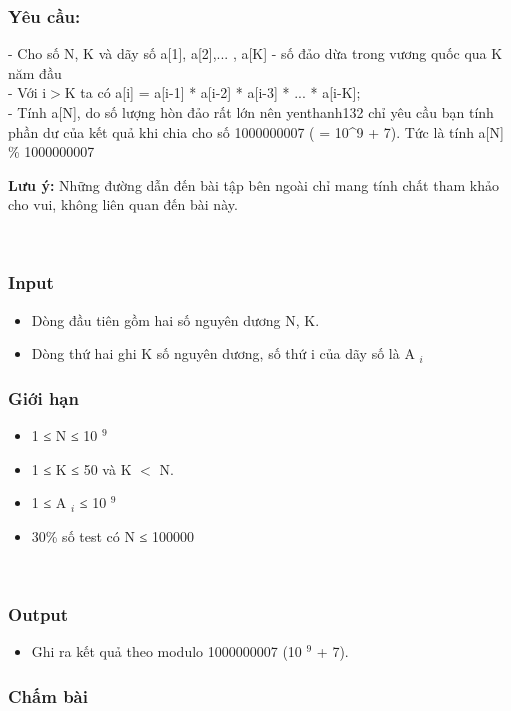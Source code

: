 \subsubsection{\textbf{Yêu cầu: }}

- Cho số N, K và dãy số a[1], a[2],... , a[K] - số đảo dừa trong vương quốc qua K năm đầu
\\- Với i$>$K ta có a[i] = a[i-1] * a[i-2] * a[i-3] * ... * a[i-K];
\\- Tính a[N], do số lượng hòn đảo rất lớn nên yenthanh132 chỉ yêu cầu bạn tính phần dư của kết quả khi chia cho số 1000000007 ( = 10^9 + 7). Tức là tính a[N] \% 1000000007

\textbf{Lưu ý: } Những đường dẫn đến bài tập bên ngoài chỉ mang tính chất tham khảo cho vui, không liên quan đến bài này.

 

\subsubsection{Input}
\begin{itemize}
	\item Dòng đầu tiên gồm hai số nguyên dương N, K.
	\item Dòng thứ hai ghi K số nguyên dương, số thứ i của dãy số là A $_ i $
\end{itemize}

\subsubsection{Giới hạn}
\begin{itemize}
	\item 1 ≤ N ≤ 10 $^ 9 $
	\item 1 ≤ K ≤ 50 và K $<$ N.
	\item 1 ≤ A $_ i $ ≤ 10 $^ 9 $
	\item 30\% số test có N ≤ 100000
\end{itemize}

 

\subsubsection{Output}
\begin{itemize}
	\item Ghi ra kết quả theo modulo 1000000007 (10 $^ 9 $ + 7).
\end{itemize}

\subsubsection{Chấm bài}

